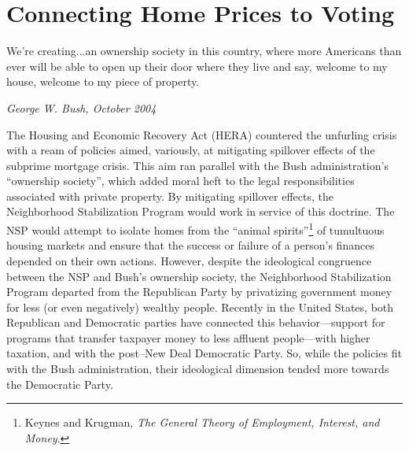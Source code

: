 \documentclass[12pt,oneside]{psthesis}
\begin{document}
\hypertarget{motive-opportunity}{%
\chapter{Connecting Home Prices to Voting}\label{motive-opportunity}}

\epigraph{We're creating...an ownership society in this country, where more Americans than ever will be able to open up their door where they live and say, welcome to my house, welcome to my piece of property.}{\textit{George W. Bush, October 2004}}

The Housing and Economic Recovery Act (HERA) countered the unfurling crisis with a ream of policies aimed, variously, at mitigating spillover effects of the subprime mortgage crisis.
This aim ran parallel with the Bush administration's ``ownership society'', which added moral heft to the legal responsibilities associated with private property.
By mitigating spillover effects, the Neighborhood Stabilization Program would work in service of this doctrine.
The NSP would attempt to isolate homes from the ``animal spirits''\footnote{Keynes and Krugman, \emph{The General Theory of Employment, Interest, and Money}.} of tumultuous housing markets and ensure that the success or failure of a person's finances depended on their own actions.
However, despite the ideological congruence between the NSP and Bush's ownership society, the Neighborhood Stabilization Program departed from the Republican Party by privatizing government money for less (or even negatively) wealthy people.
Recently in the United States, both Republican and Democratic parties have connected this behavior---support for programs that transfer taxpayer money to less affluent people---with higher taxation, and with the post--New Deal Democratic Party.
So, while the policies fit with the Bush administration, their ideological dimension tended more towards the Democratic Party.
\end{document}
